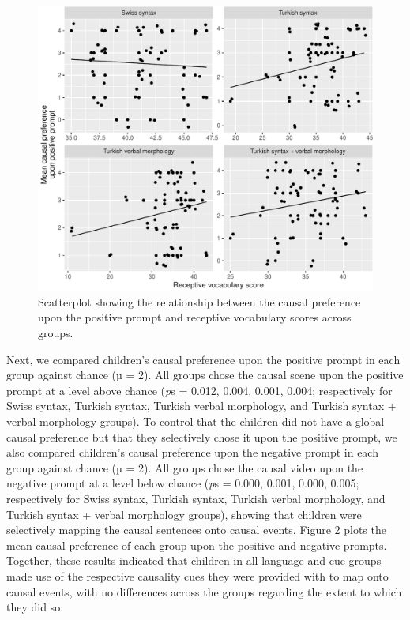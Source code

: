 \documentclass[man]{apa6}
\begin{document}
\begin{figure}[htbp]
\centering
\includegraphics{fig1-1.pdf}
\caption{\label{fig:fig1}Scatterplot showing the
relationship between the causal preference upon the positive prompt and
receptive vocabulary scores across groups.}
\end{figure}

Next, we compared children's causal preference upon the positive prompt
in each group against chance (µ = 2). All groups chose the causal scene
upon the positive prompt at a level above chance (\emph{p}s = 0.012,
0.004, 0.001, 0.004; respectively for Swiss syntax, Turkish syntax,
Turkish verbal morphology, and Turkish syntax + verbal morphology
groups). To control that the children did not have a global causal
preference but that they selectively chose it upon the positive prompt,
we also compared children's causal preference upon the negative prompt
in each group against chance (µ = 2). All groups chose the causal video
upon the negative prompt at a level below chance (\emph{p}s = 0.000,
0.001, 0.000, 0.005; respectively for Swiss syntax, Turkish syntax,
Turkish verbal morphology, and Turkish syntax + verbal morphology
groups), showing that children were selectively mapping the causal
sentences onto causal events. Figure 2 plots the mean causal preference
of each group upon the positive and negative prompts. Together, these
results indicated that children in all language and cue groups made use
of the respective causality cues they were provided with to map onto
causal events, with no differences across the groups regarding the
extent to which they did so.
\end{document}

